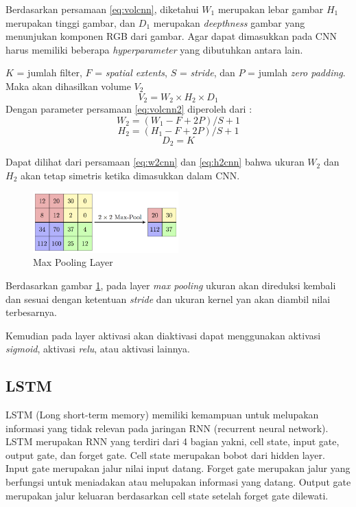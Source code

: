 \documentclass[./skripsi.tex]{subfiles}
\begin{document}
\par Berdasarkan persamaan \ref{eq:volcnn}, diketahui $W_1$ merupakan lebar gambar $H_1$ merupakan tinggi gambar, dan $D_1$ merupakan \textit{deepthness} gambar yang menunjukan komponen RGB dari gambar. Agar dapat dimasukkan pada CNN harus memiliki beberapa \textit{hyperparameter} yang dibutuhkan antara lain. 
\par $K$ = jumlah filter, $F$ = \textit{spatial extents}, $S$ = \textit{stride}, dan $P$ = jumlah \textit{zero padding}. Maka akan dihasilkan volume $V_2$
\begin{equation}
    V_2 = W_2 \times H_2 \times D_1
    \label{eq:volcnn2}
\end{equation}
Dengan parameter persamaan \ref{eq:volcnn2} diperoleh dari :
\begin{equation}
    W_2 = (W_1 - F + 2P)/S + 1
    \label{eq:w2cnn}
\end{equation}
\begin{equation}
    H_2 = (H_1 - F + 2P)/S + 1
    \label{eq:h2cnn}
\end{equation}
\begin{equation}
    D_2 = K
    \label{eq:d2cnn}
\end{equation}
\par Dapat dilihat dari persamaan \ref{eq:w2cnn} dan \ref{eq:h2cnn} bahwa ukuran $W_2$ dan $H_2$ akan tetap simetris ketika dimasukkan dalam CNN.
\begin{figure}%
    \centering
    \includegraphics[width=0.5\textwidth]{public/assets/img/MaxpoolSample2.png}
    \caption{Max Pooling Layer}
    \label{fig:maxpool}
\end{figure}
\par Berdasarkan gambar \ref{fig:maxpool}, pada layer \textit{max pooling} ukuran akan direduksi kembali dan sesuai dengan ketentuan \textit{stride} dan ukuran kernel yan akan diambil nilai terbesarnya.
\par Kemudian pada layer aktivasi akan diaktivasi dapat menggunakan aktivasi \textit{sigmoid}, aktivasi \textit{relu}, atau aktivasi lainnya.
\subsection{LSTM} 
\par LSTM (Long short-term memory) memiliki kemampuan untuk melupakan informasi yang tidak relevan pada jaringan RNN (recurrent neural network). LSTM merupakan RNN yang terdiri dari 4 bagian yakni, cell state, input gate, output gate, dan forget gate. Cell state merupakan bobot dari hidden layer. Input gate merupakan jalur nilai input datang. Forget gate merupakan jalur yang berfungsi untuk meniadakan atau melupakan informasi yang datang. Output gate merupakan jalur keluaran berdasarkan cell state setelah forget gate dilewati.
\end{document}
